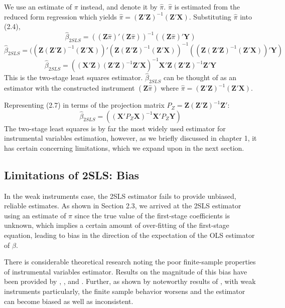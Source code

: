 We use an estimate of $\pi$ instead, and denote it  by $\hat\pi$. $\hat\pi$ is estimated from the reduced form regression which yields $\hat\pi = (\mathbf{Z}'\mathbf{Z})^{-1}(\mathbf{Z}'\mathbf{X})$. Substituting $\hat\pi$ into (2.4),
\begin{equation}
\hat\beta_{2SLS}= ((\mathbf{Z}\hat\pi)'(\mathbf{Z}\hat\pi))^{-1}((\mathbf{Z}\hat\pi)'\mathbf{Y})
\end{equation}
\begin{equation}
\hat\beta_{2SLS}= ((\mathbf{Z}(\mathbf{Z}'\mathbf{Z})^{-1}(\mathbf{Z}'\mathbf{X}))'(\mathbf{Z}(\mathbf{Z}'\mathbf{Z})^{-1}(\mathbf{Z}'\mathbf{X}))^{-1}((\mathbf{Z}(\mathbf{Z}'\mathbf{Z})^{-1}(\mathbf{Z}'\mathbf{X}))'\mathbf{Y})
\end{equation}
\begin{equation}
\hat\beta_{2SLS}= ((\mathbf{X}'\mathbf{Z})(\mathbf Z'\mathbf Z)^{-1}\mathbf Z'\mathbf X)^{-1}\mathbf X'\mathbf Z(\mathbf Z'\mathbf Z)^{-1}\mathbf Z'\mathbf Y
\end{equation}
This is the two-stage least squares estimator.
$\hat\beta_{2SLS}$ can be thought of as an estimator with the constructed instrument $(\mathbf{Z}\hat\pi)$ where $\hat\pi = (\mathbf{Z}'\mathbf{Z})^{-1}(\mathbf{Z}'\mathbf{X})$.
\par
Representing (2.7) in terms of the projection matrix  $P_{Z}=\mathbf Z(\mathbf Z'\mathbf Z)^{-1}\mathbf Z'$:
\begin{equation}
\hat{\beta }_{2SLS}=((\mathbf X'P_{Z}\mathbf X)^{-1}\mathbf X'P_{Z}\mathbf Y)
\end{equation}
The two-stage least squares is by far the most widely used estimator for instrumental variables estimation, however, as we briefly discussed in chapter 1, it has certain concerning limitations, which we expand upon in the next section.

\subsection{Limitations of 2SLS: Bias}
In the weak instruments case, the 2SLS estimator fails to provide unbiased, reliable estimates. As shown in Section 2.3, we arrived at the 2SLS estimator using an estimate of $\pi$ since the true value of the first-stage coefficients is unknown, which implies a certain amount of
over-fitting of the first-stage equation, leading to bias in the
direction of the expectation of the OLS estimator of $\beta$.


\par There is considerable  theoretical research noting the poor finite-sample properties of instrumental variables estimator. Results on the magnitude of this bias have been provided by \cite{nagar1959bias}, \cite{richardson1968exact}, \cite{sawa1969exact} and \cite{buse1992bias}. Further, as shown by noteworthy results of \cite{bound1995problems}, with weak instruments particularly, the finite sample behavior worsens and the estimator can become biased as well as inconsistent.


